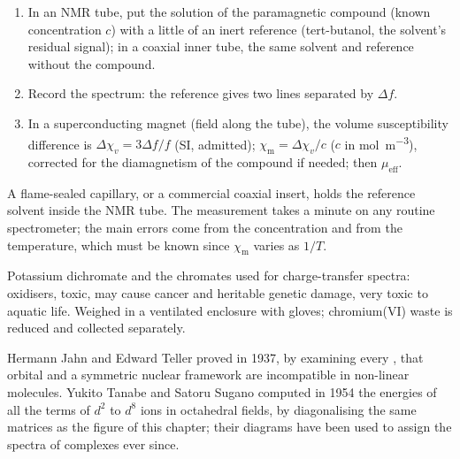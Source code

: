 \begin{method}\label{met:b3:complex-spectra-magnetism:evans}
\begin{enumerate}
  \item In an NMR tube, put the solution of the paramagnetic compound (known
        concentration $c$) with a little of an inert reference (tert-butanol, the
        solvent's residual signal); in a coaxial inner tube, the same solvent and
        reference without the compound.
  \item Record the  spectrum: the reference gives two lines separated by $\Delta f$.
  \item In a superconducting magnet (field along the tube), the volume
        susceptibility difference is $\Delta\chi_v = 3\Delta f/f$ (SI, admitted); $\chi_{\mathrm m} = \Delta\chi_v/c$ ($c$ in
        \unit{mol.m^{-3}}), corrected for the diamagnetism of the compound if needed;
        then $\mu_{\mathrm{eff}}$.
\end{enumerate}
\end{method}

\begin{inthelab}
A flame-sealed capillary, or a commercial coaxial insert, holds the reference
solvent inside the NMR tube. The measurement takes a minute on any routine
spectrometer; the main errors come from the concentration and from the
temperature, which must be known since $\chi_{\mathrm m}$ varies as $1/T$.
\end{inthelab}

\begin{safety}{}
Potassium dichromate and the chromates used for charge-transfer spectra:
oxidisers, toxic, may cause cancer and heritable genetic damage, very toxic to
aquatic life. Weighed in a ventilated enclosure with gloves; chromium(VI) waste
is reduced and collected separately.
\end{safety}

\begin{history}
Hermann Jahn and Edward Teller proved in 1937, by examining every ,
that orbital  and a symmetric nuclear framework are incompatible in
non-linear molecules. Yukito Tanabe and Satoru Sugano computed in 1954 the
energies of all the terms of $d^2$ to $d^8$ ions in octahedral fields, by
diagonalising the same matrices as the figure of this chapter; their
diagrams have been used to assign the spectra of complexes ever since.
\end{history}

